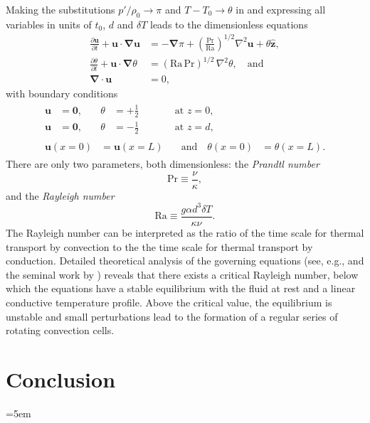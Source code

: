 \documentclass[titlepage]{article}
\numberwithin{equation}{section}
\newcommand{\pdiff}[2]{\frac{\partial #1}{\partial #2}}
\renewcommand\vec{\bm}
\newcommand{\uvec}[1]{\vec{\hat{#1}}}
\newcommand{\grad}{\vec{\nabla}}
\newcommand{\prandtl}{\ensuremath{\mathrm{Pr}}}
\newcommand{\rayleigh}{\ensuremath{\mathrm{Ra}}}
\begin{document}
Making the substitutions $p'/\rho_0 \to \pi$ and $T - T_0 \to \theta$
in  and expressing all
variables in units of $t_0$, $d$ and $\delta T$ leads to the dimensionless
equations
\begin{align}
    \label{eqn:momentum}
    \pdiff{\vec{u}}{t} + \vec{u} \cdot \grad \vec{u}
        &= -\grad \pi + \left( \frac{\prandtl}{\rayleigh}\right)^{1/2}
        \nabla^2 \vec{u} + \theta \uvec{z}, \\
    \label{eqn:energy}
    \pdiff{\theta}{t} + \vec{u} \cdot \grad \theta
        &= (\rayleigh\,\prandtl)^{1/2} \, \nabla^2 \theta, \quad \text{and} \\
    \label{eqn:incompressible}
    \grad \cdot \vec{u} &= 0,
\end{align}
with boundary conditions
\begin{gather}
\begin{alignat}{3}
    \label{eqn:bc_bot}
    \vec{u} &= \vec{0}, &\quad \theta &= +\frac{1}{2}
    &\qquad& \text{at } z = 0, \\
    \label{eqn:bc_top}
    \vec{u} &= \vec{0}, &\quad \theta &= -\frac{1}{2}
    &\qquad& \text{at } z = d,
\end{alignat} \\
\begin{alignat}{2}
    \label{eqn:bc_sides}
    \vec{u}(x=0) &= \vec{u}(x=L)
    &\quad \text{and} \quad \theta(x=0) &= \theta(x=L).
\end{alignat}
\end{gather}
There are only two parameters, both dimensionless: the \emph{Prandtl number}
\[
    \prandtl \equiv \frac{\nu}{\kappa},
\]
and the \emph{Rayleigh number}
\[
    \rayleigh \equiv \frac{g \alpha d^3 \delta T}{\kappa \nu}.
\]
The Rayleigh number can be interpreted as the ratio of the time scale
for thermal transport by convection to the the time scale for thermal
transport by conduction. Detailed theoretical analysis of the governing
equations (see, e.g., \textcite{chandrasekhar1961} and the seminal work
by \textcite{rayleigh1916}) reveals that there exists a critical
Rayleigh number, below which the equations have a stable equilibrium
with the fluid at rest and a linear conductive temperature profile.
Above the critical value, the equilibrium is unstable and small
perturbations lead to the formation of a regular series of rotating
convection cells.

\newpage
\section{Conclusion}

\emergencystretch=5em
\printbibliography
\end{document}
